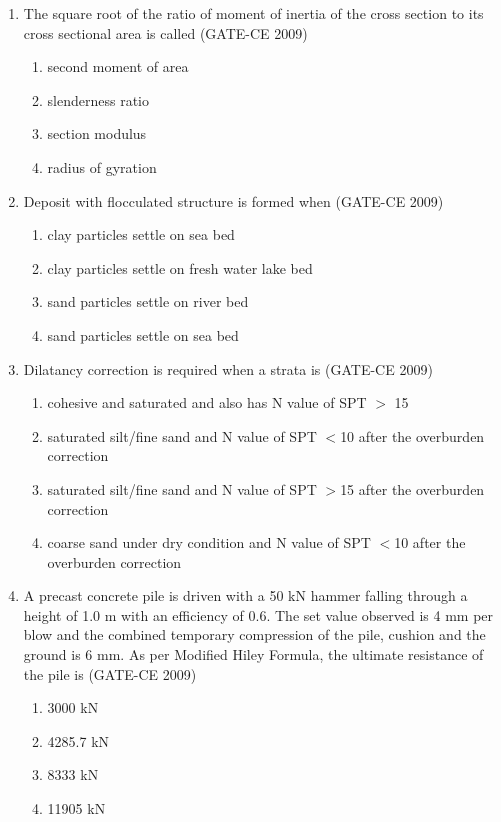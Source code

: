 \documentclass[12pt]{article}
\begin{document}
\begin{enumerate}[label=Q.\arabic*]
    \item The square root of the ratio of moment of inertia of the cross section to its cross sectional area is called (GATE-CE 2009)
    \begin{enumerate}[label=(\Alph*)]
        \item second moment of area 
        \item slenderness ratio 
        \item section modulus 
        \item radius of gyration
    \end{enumerate}
    
    \item Deposit with flocculated structure is formed when (GATE-CE 2009)
    \begin{enumerate}[label=(\Alph*)]
        \item clay particles settle on sea bed 
        \item clay particles settle on fresh water lake bed 
        \item sand particles settle on river bed 
        \item sand particles settle on sea bed
    \end{enumerate}
    
    \item Dilatancy correction is required when a strata is (GATE-CE 2009)
    \begin{enumerate}[label=(\Alph*)]
        \item cohesive and saturated and also has N value of SPT $>$ 15
        \item saturated silt/fine sand and N value of SPT $<$10 after the overburden correction
        \item saturated silt/fine sand and N value of SPT $>$15 after the overburden correction
        \item coarse sand under dry condition and N value of SPT $<$10 after the overburden correction
    \end{enumerate}
    
    \item A precast concrete pile is driven with a 50 kN hammer falling through a height of 1.0 m with an efficiency of 0.6. The set value observed is 4 mm per blow and the combined temporary compression of the pile, cushion and the ground is 6 mm. As per Modified Hiley Formula, the ultimate resistance of the pile is (GATE-CE 2009)
    \begin{enumerate}[label=(\Alph*)]
        \item 3000 kN 
        \item 4285.7 kN 
        \item 8333 kN 
        \item 11905 kN
    \end{enumerate}
    

\end{enumerate}
\end{document}
